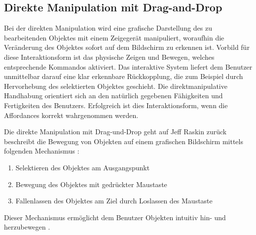 \subsection{Direkte Manipulation mit Drag-and-Drop}
Bei der direkten Manipulation wird eine grafische Darstellung des zu bearbeitenden Objektes mit einem Zeigegerät manipuliert, woraufhin die Veränderung des Objektes sofort auf dem Bildschirm zu erkennen ist. Vorbild für diese Interaktionsform ist das physische Zeigen und Bewegen, welches entsprechende Kommandos aktiviert. Das interaktive System liefert dem Benutzer unmittelbar darauf eine klar erkennbare Rückkopplung, die zum Beispiel durch Hervorhebung des selektierten Objektes geschieht. Die direktmanipulative Handhabung orientiert sich an den natürlich gegebenen Fähigkeiten und Fertigkeiten des Benutzers. Erfolgreich ist dies Interaktionsform, wenn die Affordances korrekt wahrgenommen werden. \cite[S. 351]{2010.Preim}

Die direkte Manipulation mit Drag-und-Drop geht auf Jeff Raskin zurück beschreibt die Bewegung von Objekten auf einem grafischen Bildschirm mittels folgenden Mechanismus \cite[S. 184]{2010.Preim}:
\begin{enumerate}
    \item Selektieren des Objektes am Ausgangspunkt \cite[S. 184]{2010.Preim}
    \item Bewegung des Objektes mit gedrückter Maustaste \cite[S. 184]{2010.Preim}
    \item Fallenlassen des Objektes am Ziel durch Loslassen des Maustaste \cite[S. 184]{2010.Preim}
\end{enumerate}
Dieser Mechanismus ermöglicht dem Benutzer Objekten intuitiv hin- und herzubewegen \cite[S. 129]{2010.Preim}.

